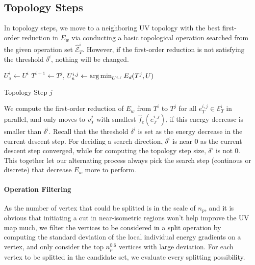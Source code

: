 
\subsection{Topology Steps}
\label{sec:topologyStep}

In topology steps, we move to a neighboring UV topology with the best first-order reduction in $E_w$ via conducting a basic topological operation searched from the given operation set $\hat{\mathcal{E}}^i_T$. However, if the first-order reduction is not satisfying the threshold $\delta^i$, nothing will be changed.

\begin{algorithm}[h]
\SetAlgoLined
{}
$U_a^{i} \leftarrow U^i$\;
{
  $T^{i+1} \leftarrow T^j$, $U_a^{i,j} \leftarrow \operatorname*{arg\,min}_{U^{i,j}} E_d(T^j,U)$\;
}
\caption{Topology Step $j$}
\end{algorithm}

We compute the first-order reduction of $E_w$ from $T^i$ to $T^j$ for all $e^{i,j}_T \in \mathcal{E}^i_T$ in parallel, and only moves to $v^j_T$ with smallest $\hat{f}_e(e^{i,j}_{T})$, if this energy decrease is smaller than $\delta^i$. Recall that the threshold $\delta^i$ is set as the energy decrease in the current descent step. For deciding a search direction, $\delta^i$ is near $0$ as the current descent step converged, while for computing the topology step size, $\delta^i$ is not $0$. This together let our alternating process always pick the search step (continous or discrete) that decrease $E_w$ more to perform.

\paragraph{Operation Filtering}
As the number of vertex that could be splitted is in the scale of $n_p$, and it is obvious that initiating a cut in near-isometric regions won't help improve the UV map much, we filter the vertices to be considered in a split operation by computing the standard deviation of the local individual energy gradients on a vertex, and only consider the top $n_p^{0.6}$ vertices with large deviation.  For each vertex to be splitted in the candidate set, we evaluate every splitting possibility.

